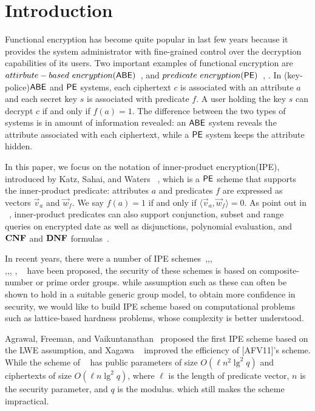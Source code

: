\section{Introduction}
Functional encryption has become quite popular in last few years because it provides the system administrator with fine-grained control over the decryption capabilities of its users. Two important examples of functional encryption are $attirbute-based\ encryption\\(\ABE)$~\cite{EC:SahWat05}, \cite{CCS:GPSW06} and $predicate\ encryption(\mathsf{PE}) $~\cite{TCC:BonWat07},
\cite{EC:KatSahWat08}. In (key-police)$\mathsf{ABE}$ and $\mathsf{PE}$ systems, each ciphertext $c$ is associated with an attribute $a$ and each secret key $s$ is associated with predicate $f$. A user holding the key $s$ can decrypt $c$ if and only if $f(a)=1$. The difference between the two types of systems is in amount of information revealed: an $\mathsf{ABE}$ system reveals the attribute associated with each ciphertext, while a $\mathsf{PE}$ system keeps the attribute hidden.\

In this paper, we focus on the notation of inner-product encryption(IPE), introduced by Katz, Sahai, and Waters ~\cite{EC:KatSahWat08}, which is a $\mathsf{PE}$ scheme that supports the inner-product predicate: attributes $a$ and predicates $f$ are expressed as vectors $\overrightarrow{v}_{a}$ and $\overrightarrow{w}_{f}$. We say $f(a)=1$ if and only if $\langle \overrightarrow{v}_{a}, \overrightarrow{w}_{f} \rangle=0$. As point out in  ~\cite{EC:KatSahWat08}, inner-product predicates can also support conjunction, subset and range queries on encrypted date\cite{TCC:BonWat07} as well as disjunctions, polynomial evaluation, and $\mathbf{CNF}$ and $\mathbf{DNF}$ formulas~\cite{EC:KatSahWat08}.\

In recent years, there were a number of IPE schemes~\cite{EC:KatSahWat08},\cite{AC:OkaTak09},\cite{EC:LOSTW10},\\ \cite{C:OkaTak10},\cite{PKC:AttLib10},\cite{Park2011Inner}, \cite{CANS:OkaTak11}, ~\cite{EC:OkaTak12} have been proposed, the security of these schemes is based on composite-number or prime order groups. while assumption such as these can often be shown to hold in a suitable generic group model, to obtain more confidence in security, we would like to build IPE scheme based on computational problems such as lattice-based hardness problems, whose complexity is better understood.\

Agrawal, Freeman, and Vaikuntanathan~ \cite{AC:AgrFreVai11} proposed the first IPE scheme based on the LWE assumption, and Xagawa ~\cite{PKC:Xagawa13} improved the efficiency of [AFV11]'s scheme. While the scheme of ~\cite{PKC:Xagawa13} has public parameters of size $O(\ell n^{2}\lg^{2}q)$ and ciphertexts of size $O(\ell n\lg^{2}q)$, where $\ell$ is the length of predicate vector, $n$ is the security parameter, and $q$ is the modulus. which still makes the scheme impractical.

